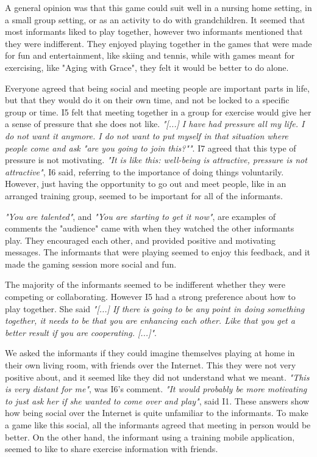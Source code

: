 A general opinion was that this game could suit well in a nursing home setting, in a small group setting, or as an activity to do with grandchildren. It seemed that most informants liked to play together, however two informants mentioned that they were indifferent. They enjoyed playing together in the games that were made for fun and entertainment, like skiing and tennis, while with games meant for exercising, like "Aging with Grace", they felt it would be better to do alone.  

Everyone agreed that being social and meeting people are important parts in life, but that they would do it on their own time, and not be locked to a specific group or time. I5 felt that meeting together in a group for exercise would give her a sense of pressure that she does not like. \emph{"[...] I have had pressure all my life. I do not want it anymore. I do not want to put myself in that situation where people come and ask "are you going to join this?""}. I7 agreed that this type of pressure is not motivating. \emph{"It is like this: well-being is attractive, pressure is not attractive"}, I6 said, referring to the importance of doing things voluntarily. However, just having the opportunity to go out and meet people, like in an arranged training group, seemed to be important for all of the informants. 

\emph{"You are talented"}, and \emph{"You are starting to get it now"}, are examples of comments the "audience" came with when they watched the other informants play. They encouraged each other, and provided positive and motivating messages. The informants that were playing seemed to enjoy this feedback, and it made the gaming session more social and fun.  

The majority of the informants seemed to be indifferent whether they were competing or collaborating. However I5 had a strong preference about how to play together. She said
\emph{"[...] If there is going to be any point in doing something together, it needs to be that you are enhancing each other. Like that you get a better result if you are cooperating. [...]"}.

We asked the informants if they could imagine themselves playing at home in their own living room, with friends over the Internet. This they were not very positive about, and it seemed like they did not understand what we meant. \emph{"This is very distant for me"}, was I6's comment. \emph{"It would probably be more motivating to just ask her if she wanted to come over and play"}, said I1. These answers show how being social over the Internet is quite unfamiliar to the informants. To make a game like this social, all the informants agreed that meeting in person would be better. On the other hand, the informant using a training mobile application, seemed to like to share exercise information with friends.

